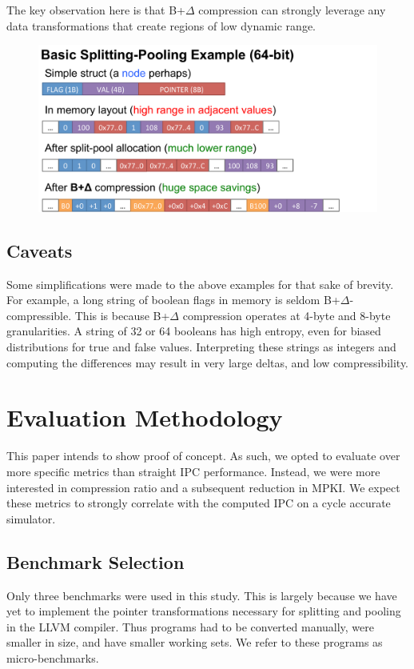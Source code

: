 \documentclass[pageno]{jpaper}
\begin{document}
The key observation here is that B+$\Delta$ compression  can strongly leverage any data transformations that create regions of low dynamic range.

\begin{figure}[bp]
  \centering
    \includegraphics[scale=0.27]{mechanisms.pdf}
\end{figure}

\subsection{Caveats}
Some simplifications were made to the above examples for that sake of brevity. For example, a long string of boolean flags in memory is seldom B+$\Delta$-compressible. This is because B+$\Delta$ compression operates at 4-byte and 8-byte granularities. A string of 32 or 64 booleans has high entropy, even for biased distributions for true and false values. Interpreting these strings as integers and computing the differences may result in very large deltas, and low compressibility.


\section{Evaluation Methodology}
This paper intends to show proof of concept. As such, we opted to evaluate over more specific metrics than straight IPC performance. Instead, we were more interested in compression ratio and a subsequent reduction in MPKI. We expect these metrics to strongly correlate with the computed IPC on a cycle accurate simulator.

\subsection{Benchmark Selection}
Only three benchmarks were used in this study. This is largely because we have yet to implement the pointer transformations necessary for splitting and pooling in the LLVM compiler. Thus programs had to be converted manually, were smaller in size, and have smaller working sets. We refer to these programs as micro-benchmarks.
\end{document}
